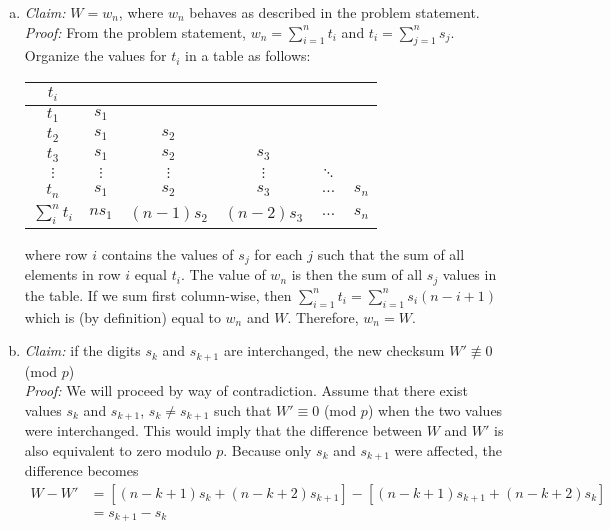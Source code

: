 \documentclass{article}
\begin{document}
\begin{enumerate}[(a)]
\item {\it Claim: } $W = w_n$, where $w_n$ behaves as described in the problem statement. \\
			{\it Proof: } From the problem statement, $w_n = \sum_{i = 1}^nt_i$ and $t_i = \sum_{j = 1}^n s_j$. Organize the values for $t_i$ in a table as follows: \\
\begin{center}
		\begin{tabular}{c|c c c c c}
		$t_i$         & \\ \hline
		$t_1$         & $s_1$ \\
		$t_2$         & $s_1$    & $s_2$ \\
		$t_3$         & $s_1$    & $s_2$        & $s_3$ \\
		$\vdots$      & $\vdots$ & $\vdots$     & $\vdots$     & $\ddots$ \\
		$t_n$         & $s_1$    & $s_2$        & $s_3$        & $\hdots$ & $s_n$\\ \hline
		$\sum_i^nt_i$ & $ns_1$   & $(n - 1)s_2$ & $(n - 2)s_3$ & $\hdots$ & $s_n$ 
		\end{tabular}
\end{center}
where row $i$ contains the values of $s_j$ for each $j$ such that the sum of all elements in row $i$ equal $t_i$. The value of $w_n$ is then the sum of all $s_j$ values in the table.  If we sum first column-wise, then $\sum_{i=1}^nt_i = \sum_{i=1}^n s_i(n - i + 1)$ which is (by definition) equal to $w_n$ and $W$. Therefore, $w_n = W$.
\item {\it Claim: }if the digits $s_k$ and $s_{k + 1}$ are interchanged, the new checksum $W'\not\equiv 0$ (mod $p$) \\
			{\it Proof: } We will proceed by way of contradiction. Assume that there exist values $s_k$ and $s_{k+1}$, $s_k \ne s_{k+1}$ such that $W' \equiv 0$ (mod $p$) when the two values were interchanged. This would imply that the difference between $W$ and $W'$ is also equivalent to zero modulo $p$. Because only $s_k$ and $s_{k+1}$ were affected, the difference becomes 
\begin{equation*}\begin{aligned}
	W - W' &= \left [ (n - k + 1)s_k + (n - k + 2)s_{k+1}\right ] - \left [ (n - k + 1)s_{k+1} + (n - k + 2)s_k\right ]	\\
         &= s_{k+1} - s_k
\end{aligned}\end{equation*} 

\end{enumerate}
\end{document}
